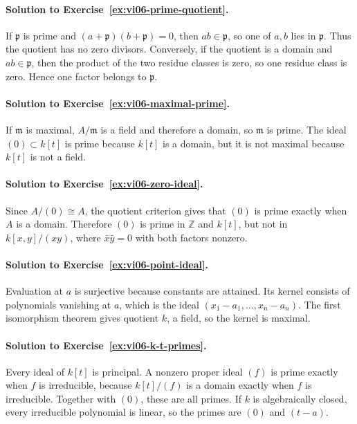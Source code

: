 \paragraph{Solution to Exercise~\ref{ex:vi06-prime-quotient}.}
If \(\mathfrak p\) is prime and \((a+\mathfrak p)(b+\mathfrak p)=0\), then
\(ab\in\mathfrak p\), so one of \(a,b\) lies in \(\mathfrak p\).  Thus the quotient has
no zero divisors.  Conversely, if the quotient is a domain and \(ab\in\mathfrak p\), then
the product of the two residue classes is zero, so one residue class is zero.  Hence one
factor belongs to \(\mathfrak p\).

\paragraph{Solution to Exercise~\ref{ex:vi06-maximal-prime}.}
If \(\mathfrak m\) is maximal, \(A/\mathfrak m\) is a field and therefore a domain, so
\(\mathfrak m\) is prime.  The ideal \((0)\subset k[t]\) is prime because \(k[t]\) is a
domain, but it is not maximal because \(k[t]\) is not a field.

\paragraph{Solution to Exercise~\ref{ex:vi06-zero-ideal}.}
Since \(A/(0)\cong A\), the quotient criterion gives that \((0)\) is prime exactly when
\(A\) is a domain.  Therefore \((0)\) is prime in \(\mathbb Z\) and \(k[t]\), but not in
\(k[x,y]/(xy)\), where \(\bar x\bar y=0\) with both factors nonzero.

\paragraph{Solution to Exercise~\ref{ex:vi06-point-ideal}.}
Evaluation at \(a\) is surjective because constants are attained.  Its kernel consists of
polynomials vanishing at \(a\), which is the ideal
\((x_1-a_1,\dots,x_n-a_n)\).  The first isomorphism theorem gives quotient \(k\), a field,
so the kernel is maximal.

\paragraph{Solution to Exercise~\ref{ex:vi06-k-t-primes}.}
Every ideal of \(k[t]\) is principal.  A nonzero proper ideal \((f)\) is prime exactly when
\(f\) is irreducible, because \(k[t]/(f)\) is a domain exactly when \(f\) is irreducible.
Together with \((0)\), these are all primes.  If \(k\) is algebraically closed, every
irreducible polynomial is linear, so the primes are \((0)\) and \((t-a)\).

